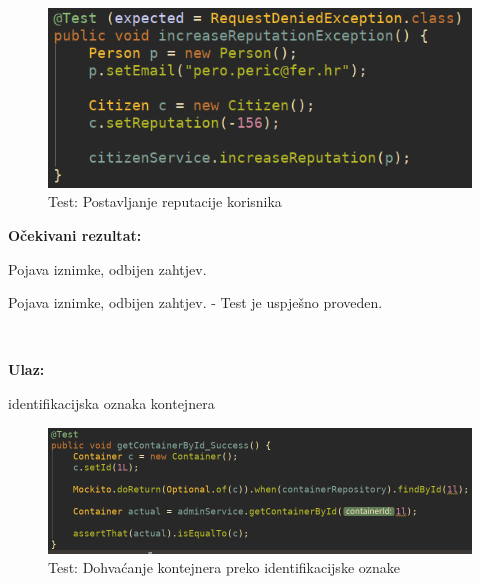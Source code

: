			\begin{figure}[H]
					\includegraphics[scale=0.57]{figures/Screenshot_20200115_223858.PNG}
					\centering
					\caption{Test: Postavljanje reputacije korisnika}
					\label{fig:Postavljanje reputacije korisnika}
				\end{figure}	
			
			\noindent \textbf{Očekivani rezultat:}
				\begin{packed_enum}
				\item Pojava iznimke, odbijen zahtjev.
							
				
			\end{packed_enum}
			
		
			Pojava iznimke, odbijen zahtjev. - Test je uspješno proveden.			


					
			
			\noindent {}
			
			\
			
			\noindent \textbf{Ulaz:}
			
			\begin{packed_enum}
				\item identifikacijska oznaka kontejnera
					
				
			\end{packed_enum}

			\begin{figure}[H]
					\includegraphics[scale=0.57]{figures/Screenshot_20200115_224020.PNG}
					\centering
					\caption{Test: Dohvaćanje kontejnera preko identifikacijske oznake}
					\label{fig:Dohvaćanje kontejnera preko identifikacijske oznake}
				\end{figure}	
			
